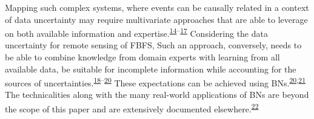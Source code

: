 \documentclass[12pt,oneside]{article}
\begin{document}
Mapping such complex systems, where events can be causally related in a context of data uncertainty may require multivariate approaches that are able to leverage on both available information and expertise.\textsuperscript{\protect\hyperlink{ref-Hubbard_2014}{14}--\protect\hyperlink{ref-Whitney_et_al_2018}{17}} Considering the data uncertainty for remote sensing of FBFS, Such an approach, conversely, needs to be able to combine knowledge from domain experts with learning from all available data, be suitable for incomplete information while accounting for the sources of uncertainties.\textsuperscript{\protect\hyperlink{ref-Kuhnert_2011}{18}--\protect\hyperlink{ref-Whitney_et_al_2018a}{20}} These expectations can be achieved using BNs.\textsuperscript{\protect\hyperlink{ref-Whitney_et_al_2018a}{20},\protect\hyperlink{ref-Yet_et_al_2016}{21}} The technicalities along with the many real-world applications of BNs are beyond the scope of this paper and are extensively documented elsewhere.\textsuperscript{\protect\hyperlink{ref-Pourret_et_al_2008}{22}}
\end{document}
